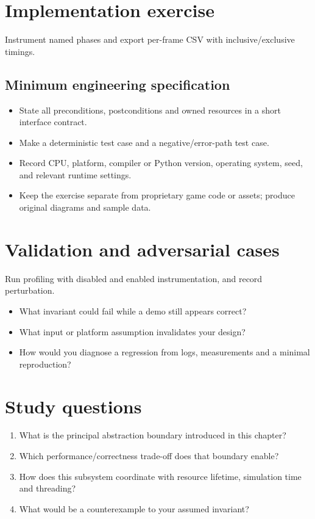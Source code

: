 \documentclass[11pt,letterpaper]{article}
\begin{document}
\section{Implementation exercise}
Instrument named phases and export per-frame CSV with inclusive/exclusive timings.

\subsection{Minimum engineering specification}
\begin{itemize}
\item State all preconditions, postconditions and owned resources in a short interface contract.
\item Make a deterministic test case and a negative/error-path test case.
\item Record CPU, platform, compiler or Python version, operating system, seed, and relevant runtime settings.
\item Keep the exercise separate from proprietary game code or assets; produce original diagrams and sample data.
\end{itemize}
\section{Validation and adversarial cases}
Run profiling with disabled and enabled instrumentation, and record perturbation.

\begin{itemize}
\item What invariant could fail while a demo still appears correct?
\item What input or platform assumption invalidates your design?
\item How would you diagnose a regression from logs, measurements and a minimal reproduction?
\end{itemize}
\section{Study questions}
\begin{enumerate}
\item What is the principal abstraction boundary introduced in this chapter?
\item Which performance/correctness trade-off does that boundary enable?
\item How does this subsystem coordinate with resource lifetime, simulation time and threading?
\item What would be a counterexample to your assumed invariant?
\end{enumerate}
\end{document}
